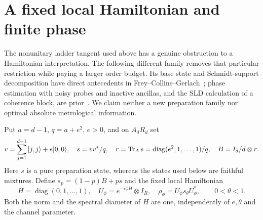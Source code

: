 \section{A fixed local Hamiltonian and finite phase}\label{sec:phase}
The nonunitary ladder tangent used above has a genuine obstruction to a Hamiltonian interpretation. The following different family removes that particular restriction while paying a larger order budget. Its base state and Schmidt-support decomposition have direct antecedents in Frey--Collins--Gerlach~\cite{FCG}; phase estimation with noisy probes and inactive ancillas, and the SLD calculation of a coherence block, are prior~\cite{CB}. We claim neither a new preparation family nor optimal absolute metrological information.

Put $a=d-1$, $q=a+e^2$, $e>0$, and on $A_dR_d$ set
\[
 v=\sum_{j=1}^{d-1}|j,j\rangle+e|0,0\rangle,\quad
 s=vv^*/q,\quad r=\operatorname{Tr}_A s=\operatorname{diag}(e^2,1,\ldots,1)/q,
 \quad B=I_d/d\otimes r.
\]
Here $s$ is a pure preparation state, whereas the states used below are faithful mixtures. Define $s_p=(1-p)B+ps$ and the fixed local Hamiltonian
\[
 H=\operatorname{diag}(0,1,\ldots,1),\quad
 U_\phi=e^{-i\phi H}\otimes I_R,\quad
 \rho_\phi=U_\phi s_\theta U_\phi^*,\qquad 0<\theta<1.
\]
Both the norm and the spectral diameter of $H$ are one, independently of $e,\theta$ and the channel parameter.

